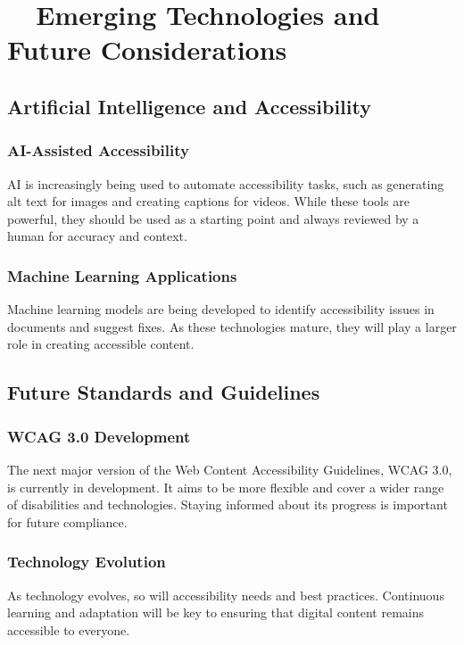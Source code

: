 \section{~~Emerging Technologies and Future Considerations}\label{ch15:sec:emerging-tech}

\subsection{Artificial Intelligence and Accessibility}\label{ch15:ssec:ai-a11y}

\subsubsection{AI-Assisted Accessibility}\label{ch15:sssec:ai-assisted-a11y}
AI is increasingly being used to automate accessibility tasks, such as generating alt text for images and creating captions for videos. While these tools are powerful, they should be used as a starting point and always reviewed by a human for accuracy and context.

\subsubsection{Machine Learning Applications}\label{ch15:sssec:ml-apps}
Machine learning models are being developed to identify accessibility issues in documents and suggest fixes. As these technologies mature, they will play a larger role in creating accessible content.

\subsection{Future Standards and Guidelines}\label{ch15:ssec:future-standards}

\subsubsection{WCAG 3.0 Development}\label{ch15:sssec:wcag3}
The next major version of the Web Content Accessibility Guidelines, WCAG 3.0, is currently in development. It aims to be more flexible and cover a wider range of disabilities and technologies. Staying informed about its progress is important for future compliance.

\subsubsection{Technology Evolution}\label{ch15:sssec:tech-evolution}
As technology evolves, so will accessibility needs and best practices. Continuous learning and adaptation will be key to ensuring that digital content remains accessible to everyone.

